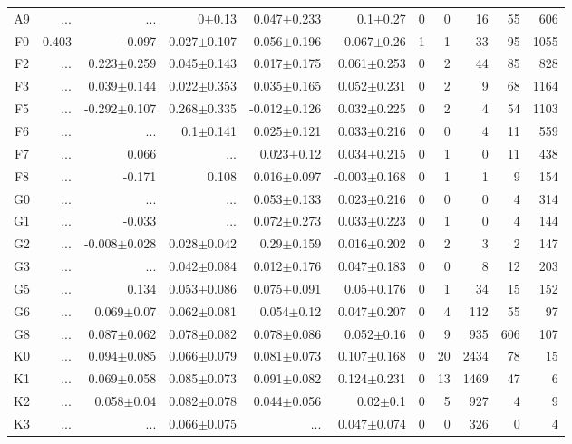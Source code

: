 \begin{table}[t]
\begin{table}[t]
\begin{center}
\begin{tabular}{c|rrrrr|rrrrr}
    A9	&	 ...	&	 ...	&	0$\pm$0.13	&	0.047$\pm$0.233	&	0.1$\pm$0.27	&	0	&	0	&	16	&	55	&	606	\\
    F0	&	0.403	&	-0.097	&	0.027$\pm$0.107	&	0.056$\pm$0.196	&	0.067$\pm$0.26	&	1	&	1	&	33	&	95	&	1055	\\
    F2	&	 ...	&	0.223$\pm$0.259	&	0.045$\pm$0.143	&	0.017$\pm$0.175	&	0.061$\pm$0.253	&	0	&	2	&	44	&	85	&	828	\\
    F3	&	 ...	&	0.039$\pm$0.144	&	0.022$\pm$0.353	&	0.035$\pm$0.165	&	0.052$\pm$0.231	&	0	&	2	&	9	&	68	&	1164	\\
    F5	&	 ...	&	-0.292$\pm$0.107	&	0.268$\pm$0.335	&	-0.012$\pm$0.126	&	0.032$\pm$0.225	&	0	&	2	&	4	&	54	&	1103	\\
    F6	&	 ...	&	 ...	&	0.1$\pm$0.141	&	0.025$\pm$0.121	&	0.033$\pm$0.216	&	0	&	0	&	4	&	11	&	559	\\
    F7	&	 ...	&	0.066	&	 ...	&	0.023$\pm$0.12	&	0.034$\pm$0.215	&	0	&	1	&	0	&	11	&	438	\\
    F8	&	 ...	&	-0.171	&	0.108	&	0.016$\pm$0.097	&	-0.003$\pm$0.168	&	0	&	1	&	1	&	9	&	154	\\
    G0	&	 ...	&	 ...	&	 ...	&	0.053$\pm$0.133	&	0.023$\pm$0.216	&	0	&	0	&	0	&	4	&	314	\\
    G1	&	 ...	&	-0.033	&	 ...	&	0.072$\pm$0.273	&	0.033$\pm$0.223	&	0	&	1	&	0	&	4	&	144	\\
    G2	&	 ...	&	-0.008$\pm$0.028	&	0.028$\pm$0.042	&	0.29$\pm$0.159	&	0.016$\pm$0.202	&	0	&	2	&	3	&	2	&	147	\\
    G3	&	 ...	&	 ...	&	0.042$\pm$0.084	&	0.012$\pm$0.176	&	0.047$\pm$0.183	&	0	&	0	&	8	&	12	&	203	\\
    G5	&	 ...	&	0.134	&	0.053$\pm$0.086	&	0.075$\pm$0.091	&	0.05$\pm$0.176	&	0	&	1	&	34	&	15	&	152	\\
    G6	&	 ...	&	0.069$\pm$0.07	&	0.062$\pm$0.081	&	0.054$\pm$0.12	&	0.047$\pm$0.207	&	0	&	4	&	112	&	55	&	97	\\
    G8	&	 ...	&	0.087$\pm$0.062	&	0.078$\pm$0.082	&	0.078$\pm$0.086	&	0.052$\pm$0.16	&	0	&	9	&	935	&	606	&	107	\\
    K0	&	 ...	&	0.094$\pm$0.085	&	0.066$\pm$0.079	&	0.081$\pm$0.073	&	0.107$\pm$0.168	&	0	&	20	&	2434	&	78	&	15	\\
    K1	&	 ...	&	0.069$\pm$0.058	&	0.085$\pm$0.073	&	0.091$\pm$0.082	&	0.124$\pm$0.231	&	0	&	13	&	1469	&	47	&	6	\\
    K2	&	 ...	&	0.058$\pm$0.04	&	0.082$\pm$0.078	&	0.044$\pm$0.056	&	0.02$\pm$0.1	&	0	&	5	&	927	&	4	&	9	\\
    K3	&	 ...	&	 ...	&	0.066$\pm$0.075	&	 ...	&	0.047$\pm$0.074	&	0	&	0	&	326	&	0	&	4	\\

\end{tabular}
\end{center}
\end{table}
\end{table}
